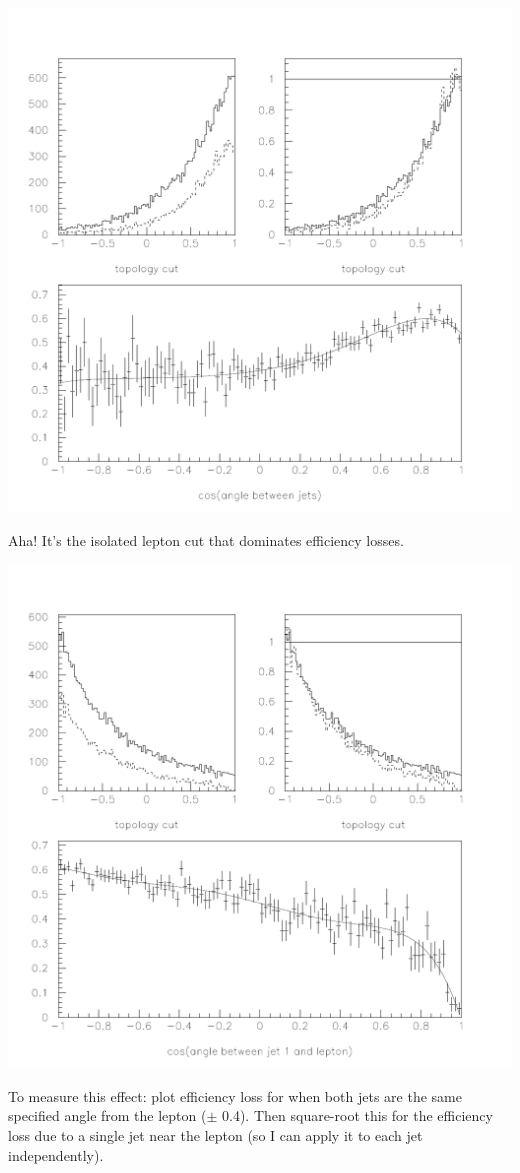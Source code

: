 \documentclass[landscape]{article}
\begin{document}
\vfill

\includegraphics[width=0.7\linewidth]{jet_confusion1.pdf}

\pagebreak

Aha!  It's the isolated lepton cut that dominates efficiency losses.

\vfill

\includegraphics[width=0.7\linewidth]{jet_confusion2.pdf}

\pagebreak

To measure this effect: plot efficiency loss for when both jets are
the same specified angle from the lepton ($\pm$ 0.4).  Then
square-root this for the efficiency loss due to a single jet near the
lepton (so I can apply it to each jet independently).

\vfill
\end{document}
